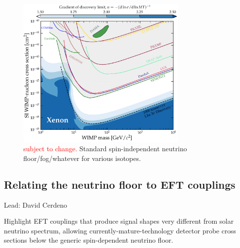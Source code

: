 \begin{figure}[tbh]
    \centering
    \includegraphics[width=0.75\textwidth]{figures/single_panel_nufog_blues_v3.pdf}
    \caption{\textcolor{red}{subject to change.} Standard spin-independent neutrino floor/fog/whatever for various isotopes.}
    \label{fig:neutrino_floor}
\end{figure}


\subsection{Relating the neutrino floor to EFT couplings}
Lead: David Cerdeno

Highlight EFT couplings that produce signal shapes very different from solar neutrino spectrum, allowing currently-mature-technology detector probe cross sections below the generic spin-dependent neutrino floor. 


